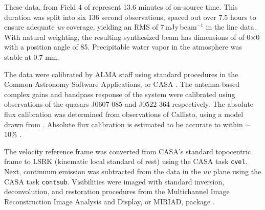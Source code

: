 



These data, from Field 4 of \citet{Mann2014} represent 13.6 minutes of on-source time. This duration was split into six 136 second observations, spaced out over 7.5 hours to ensure adequate \textit{uv} coverage, yielding an RMS of 7\,mJy\,beam$^{-1}$ in the line data. With natural weighting, the resulting synthesized beam has dimensions of of 0$\times$0 with a position angle of 85\degree. Precipitable water vapor in the atmosphere was stable at 0.7 mm.


The data were calibrated by ALMA staff using standard procedures in the Common Astronomy Software Applications, or CASA \citep{McMullin2007}. The antenna-based complex gains and bandpass response of the system were calibrated using observations of the quasars J0607-085 and J0522-364 respectively. The absolute flux calibration was determined from observations of Callisto, using a model drawn from \citet{Butler2012}. Absolute flux calibration is estimated to be accurate to within $\sim$10\% \citep{Mann2014}.



The velocity reference frame was converted from CASA's standard topocentric frame to LSRK (kinematic local standard of rest) using the CASA task \texttt{cvel}. Next, continuum emission was subtracted from the data in the $uv$ plane using the CASA task \texttt{contsub}. Visibilities were imaged with standard inversion, deconvolution, and restoration procedures from the Multichannel Image Reconstruction Image Analysis and Display, or \textsc{MIRIAD}, package \citep{Sault1995}.
